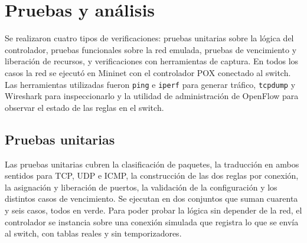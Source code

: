 ﻿\documentclass[10pt,a4paper]{article}
\begin{document}
\section{Pruebas y análisis}
Se realizaron cuatro tipos de verificaciones: pruebas unitarias sobre la lógica del
controlador, pruebas funcionales sobre la red emulada, pruebas de vencimiento y
liberación de recursos, y verificaciones con herramientas de captura. En todos los
casos la red se ejecutó en Mininet con el controlador POX conectado al switch. Las
herramientas utilizadas fueron \texttt{ping} e \texttt{iperf} para generar tráfico,
\texttt{tcpdump} y Wireshark para inspeccionarlo y la utilidad de administración de
OpenFlow para observar el estado de las reglas en el switch.

\subsection{Pruebas unitarias}

Las pruebas unitarias cubren la clasificación de paquetes, la traducción en ambos
sentidos para TCP, UDP e ICMP, la construcción de las dos reglas por conexión, la
asignación y liberación de puertos, la validación de la configuración y los distintos
casos de vencimiento. Se ejecutan en dos conjuntos que suman cuarenta y seis casos,
todos en verde. Para poder probar la lógica sin depender de la red, el controlador se
instancia sobre una conexión simulada que registra lo que se envía al switch, con
tablas reales y sin temporizadores.
\end{document}
